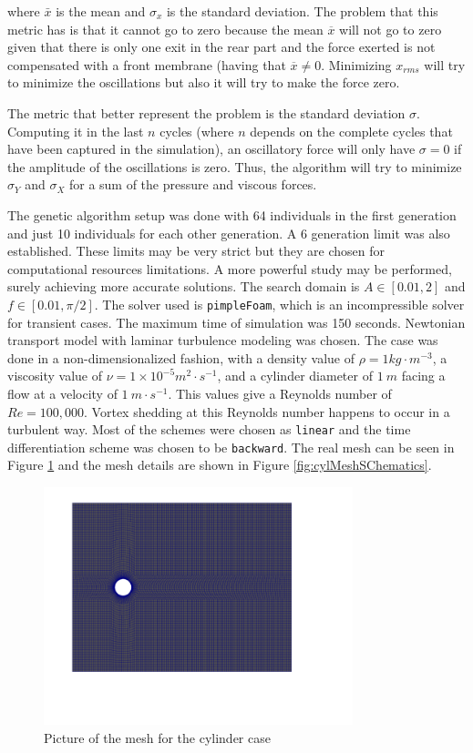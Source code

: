 where $\bar{x}$ is the mean and $\sigma_x$ is the standard deviation. The problem that this metric has is that it cannot go to zero because the mean $\overline{x}$ will not go to zero given that there is only one exit in the rear part and the force exerted is not compensated with a front membrane (having that $\overline{x}\neq 0$. Minimizing $x_{rms}$ will try to minimize the oscillations but also it will try to make the force zero. 

The metric that better represent the problem is the standard deviation $\sigma$. Computing it in the last $n$ cycles (where $n$ depends on the complete cycles that have been captured in the simulation), an oscillatory force will only have $\sigma=0$ if the amplitude of the oscillations is zero. Thus, the algorithm will try to minimize $\sigma_Y$ and $\sigma_X$ for a sum of the pressure and viscous forces.

The genetic algorithm setup was done with 64 individuals in the first generation and just 10 individuals for each other generation. A 6 generation limit was also established. These limits may be very strict but they are chosen for computational resources limitations. A more powerful study may be performed, surely achieving more accurate solutions. The search domain is $A\in[0.01,2]$ and $f\in[0.01,\pi/2]$. The solver used is \texttt{pimpleFoam}, which is an incompressible solver for transient cases. The maximum time of simulation was 150 seconds. Newtonian transport model with laminar turbulence modeling was chosen. The case was done in a non-dimensionalized fashion, with a density value of $\rho=1 kg\cdot m^{-3}$, a viscosity value of $\nu=1\times 10^{-5} m^2\cdot s^{-1}$, and a cylinder diameter of $1\ m$ facing a flow at a velocity of $1\ m\cdot s^{-1}$. This values give a Reynolds number of $Re = 100,000$. Vortex shedding at this Reynolds number happens to occur in a turbulent way. Most of the schemes were chosen as \texttt{linear} and the time differentiation scheme was chosen to be \texttt{backward}. The real mesh can be seen in Figure \ref{fig:cylMeshSChematicsPF} and the mesh details are shown in Figure \ref{fig:cylMeshSChematics}.


    \begin{figure}[h!]
        \centering
        \includegraphics[width=0.8\textwidth]{Figures/3/cylinderMeshPF.png}
        \caption{Picture of the mesh for the cylinder case}
        \label{fig:cylMeshSChematicsPF}
    \end{figure}

